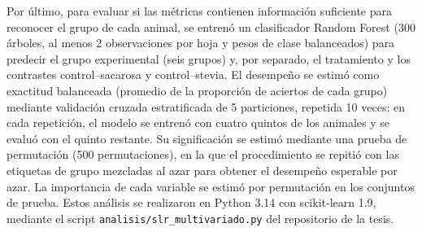 Por último, para evaluar si las métricas contienen información suficiente para reconocer el grupo de cada animal, se entrenó un clasificador Random Forest \cite{breiman2001rf} (300 árboles, al menos 2 observaciones por hoja y pesos de clase balanceados) para predecir el grupo experimental (seis grupos) y, por separado, el tratamiento y los contrastes control--sacarosa y control--stevia. El desempeño se estimó como exactitud balanceada (promedio de la proporción de aciertos de cada grupo) mediante validación cruzada estratificada de 5 particiones, repetida 10 veces: en cada repetición, el modelo se entrenó con cuatro quintos de los animales y se evaluó con el quinto restante. Su significación se estimó mediante una prueba de permutación (500 permutaciones), en la que el procedimiento se repitió con las etiquetas de grupo mezcladas al azar para obtener el desempeño esperable por azar. La importancia de cada variable se estimó por permutación en los conjuntos de prueba. Estos análisis se realizaron en Python 3.14 con scikit-learn 1.9, mediante el script \texttt{analisis/slr\_multivariado.py} del repositorio de la tesis.
